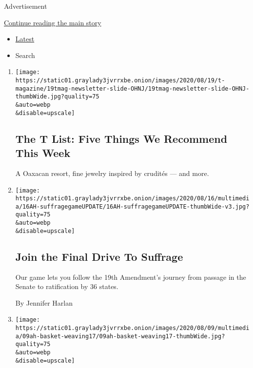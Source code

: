 Advertisement

\protect\hyperlink{after-mid1}{Continue reading the main story}

\begin{itemize}
\tightlist
\item
  \protect\hyperlink{stream-panel}{Latest}
\item
  Search
\end{itemize}

\begin{enumerate}
\def\labelenumi{\arabic{enumi}.}
\item
  \href{/2020/08/20/t-magazine/monte-uzulu-vivanterre-emme-parsons.html}{}

  \texttt{[image: https://static01.graylady3jvrrxbe.onion/images/2020/08/19/t-magazine/19tmag-newsletter-slide-OHNJ/19tmag-newsletter-slide-OHNJ-thumbWide.jpg?quality=75\\\&auto=webp\\\&disable=upscale]}

  \hypertarget{the-t-list-five-things-we-recommend-this-week}{%
  \subsection{The T List: Five Things We Recommend This
  Week}\label{the-t-list-five-things-we-recommend-this-week}}

  A Oaxacan resort, fine jewelry inspired by crudités --- and more.
\item
  \href{/2020/08/15/at-home/play-suffrage-game.html}{}

  \texttt{[image: https://static01.graylady3jvrrxbe.onion/images/2020/08/16/multimedia/16AH-suffragegameUPDATE/16AH-suffragegameUPDATE-thumbWide-v3.jpg?quality=75\\\&auto=webp\\\&disable=upscale]}

  \hypertarget{join-the-final-drive-to-suffrage}{%
  \subsection{Join the Final Drive To
  Suffrage}\label{join-the-final-drive-to-suffrage}}

  Our game lets you follow the 19th Amendment's journey from passage in
  the Senate to ratification by 36 states.

  By Jennifer Harlan
\item
  \href{/2020/08/08/at-home/coronavirus-newspaper-basket.html}{}

  \texttt{[image: https://static01.graylady3jvrrxbe.onion/images/2020/08/09/multimedia/09ah-basket-weaving17/09ah-basket-weaving17-thumbWide.jpg?quality=75\\\&auto=webp\\\&disable=upscale]}


\end{enumerate}
